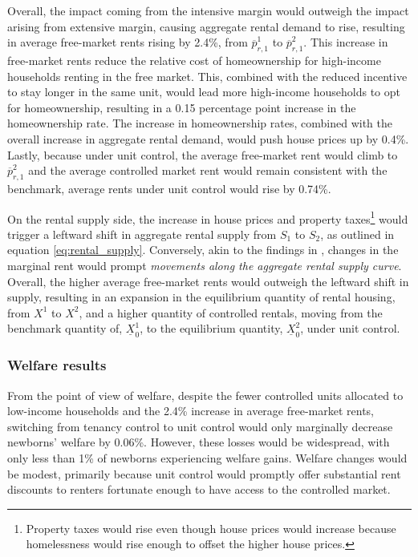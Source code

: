 \documentclass[parskip=full]{article}
\begin{document}
Overall, the impact coming from the intensive margin would outweigh the impact arising from extensive margin, causing aggregate rental demand to rise, resulting in average free-market rents rising by 2.4\%, from $\overline{p}^{1}_{r,1}$ to $\overline{p}^{2}_{r,1}$. This increase in free-market rents reduce the relative cost of homeownership for high-income households renting in the free market. This, combined with the reduced incentive to stay longer in the same unit, would lead more high-income households to opt for homeownership, resulting in a 0.15 percentage point increase in the homeownership rate. The increase in homeownership rates, combined with the overall increase in aggregate rental demand, would push house prices up by 0.4\%. Lastly, because under unit control, the average free-market rent would climb to $\overline{p}^{2}_{r,1}$ and the average controlled market rent would remain consistent with the benchmark, average rents under unit control would rise by 0.74\%.

On the rental supply side, the increase in house prices and property taxes\footnote{Property taxes would rise even though house prices would increase because homelessness would rise enough to offset the higher house prices.} would trigger a leftward shift in aggregate rental supply from $S_{1}$ to $S_{2}$, as outlined in equation \eqref{eq:rental_supply}. Conversely, akin to the findings in \citet{fallis-1985}, changes in the marginal rent would prompt \textsl{movements along the aggregate rental supply curve}. Overall, the higher average free-market rents would outweigh the leftward shift in supply, resulting in an expansion in the equilibrium quantity of rental housing, from $X^{1}$ to $X^{2}$, and a higher quantity of controlled rentals, moving from the benchmark quantity of, $\underline{X}^{1}_{0}$, to the equilibrium quantity, $\underline{X}^{2}_{0}$, under unit control. 

\subsubsection{Welfare results}

From the point of view of welfare, despite the fewer controlled units allocated to low-income households and the 2.4\% increase in average free-market rents, switching from tenancy control to unit control would only marginally decrease newborns' welfare by 0.06\%. However, these losses would be widespread, with only less than 1\% of newborns experiencing welfare gains. Welfare changes would be modest, primarily because unit control would promptly offer substantial rent discounts to renters fortunate enough to have access to the controlled market.
\end{document}
